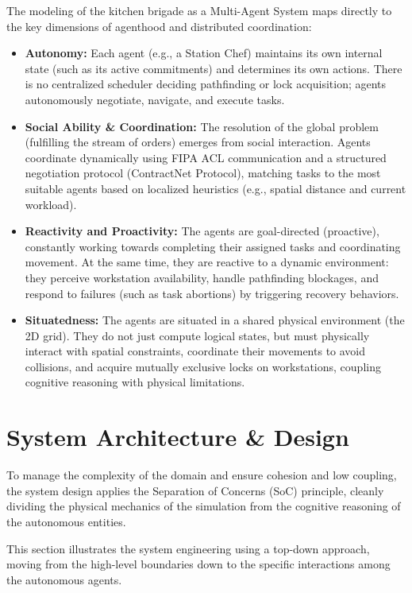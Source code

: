 \documentclass{scrartcl}
\begin{document}
The modeling of the kitchen brigade as a Multi-Agent System maps directly to the key dimensions of agenthood and distributed coordination:

\begin{itemize}
\item \textbf{Autonomy:} Each agent (e.g., a Station Chef) maintains its own internal state (such as its active commitments) and determines its own actions. There is no centralized scheduler deciding pathfinding or lock acquisition; agents autonomously negotiate, navigate, and execute tasks.
\item \textbf{Social Ability \& Coordination:} The resolution of the global problem (fulfilling the stream of orders) emerges from social interaction. Agents coordinate dynamically using FIPA ACL communication and a structured negotiation protocol (ContractNet Protocol), matching tasks to the most suitable agents based on localized heuristics (e.g., spatial distance and current workload).
\item \textbf{Reactivity and Proactivity:} The agents are goal-directed (proactive), constantly working towards completing their assigned tasks and coordinating movement. At the same time, they are reactive to a dynamic environment: they perceive workstation availability, handle pathfinding blockages, and respond to failures (such as task abortions) by triggering recovery behaviors.
\item \textbf{Situatedness:} The agents are situated in a shared physical environment (the 2D grid). They do not just compute logical states, but must physically interact with spatial constraints, coordinate their movements to avoid collisions, and acquire mutually exclusive locks on workstations, coupling cognitive reasoning with physical limitations.
\end{itemize}


\newpage

\section{System Architecture \& Design}

To manage the complexity of the domain and ensure cohesion and low coupling, the system design applies the Separation of Concerns (SoC) principle, cleanly dividing the physical mechanics of the simulation from the cognitive reasoning of the autonomous entities.

This section illustrates the system engineering using a top-down approach, moving from the high-level boundaries down to the specific interactions among the autonomous agents.
\end{document}
